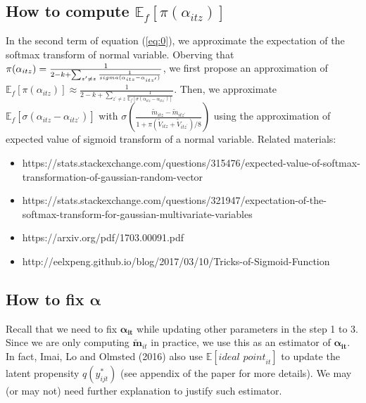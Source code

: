 \documentclass{article}
\begin{document}
\subsection{How to compute $\mathbb{E}_{f} \left[\pi(\alpha_{itz})\right]$}
\label{Esoft}
In the second term of equation (\ref{eq:0}), we approximate the expectation of the softmax transform of normal variable. Oberving that $\pi(\alpha_{itz}) = \frac{1}{2-k + \sum_{z^\prime \neq z} \frac{1}{\\sigma(\alpha_{itz}-\alpha_{itz^\prime})}}$, we first propose an approximation of $\mathbb{E}_{f} \left[\pi(\alpha_{itz})\right] \approx \frac{1}{2-k + \sum_{z^\prime \neq z} \frac{1}{\mathbb{E}_{f}[\sigma(\alpha_{itz}-\alpha_{itz^\prime})]}}$. Then, we approximate $\mathbb{E}_{f}[\sigma(\alpha_{itz}-\alpha_{itz^\prime})]$ with $\sigma\left(\frac{\widetilde{m}_{itz}-\widetilde{m}_{itz^\prime}}{1+\pi\left(\widetilde{V}_{itz}+\widetilde{V}_{itz^\prime}\right)/8}\right)$ using the approximation of expected value of sigmoid transform of a normal variable. Related materials:
\begin{itemize}
\item https://stats.stackexchange.com/questions/315476/expected-value-of-softmax-transformation-of-gaussian-random-vector
\item https://stats.stackexchange.com/questions/321947/expectation-of-the-softmax-transform-for-gaussian-multivariate-variables
\item https://arxiv.org/pdf/1703.00091.pdf
\item http://eelxpeng.github.io/blog/2017/03/10/Tricks-of-Sigmoid-Function
\end{itemize}

\subsection{How to fix $\bm{\alpha}$}
Recall that we need to fix $\bm{\alpha_{it}}$ while updating other parameters in the step 1 to 3. Since we are only computing $\widetilde{\bm m}_{it}$ in practice, we use this as an estimator of $\bm{\alpha_{it}}$.
In fact, Imai, Lo and Olmsted (2016) also use $\mathbb{E}[\textit{ideal point}_{it}]$ to update the latent propensity $q(y^*_{ijt})$ (see appendix of the paper for more details). We may (or may not) need further explanation to justify such estimator.
\end{document}
